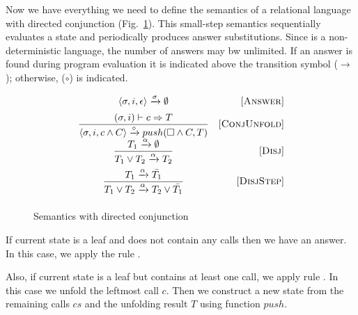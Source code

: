 
Now we have everything we need to define the semantics of a relational language with directed conjunction (Fig.~\ref{fair:classic-semantics}). This small-step semantics sequentially
evaluates a state and periodically produces answer substitutions. Since \mk is a non-deterministic language, the number of answers may bw unlimited.
If an answer is found during program evaluation it is indicated above the transition symbol ($\xrightarrow{}$); otherwise, ($\circ$) is indicated.

\begin{figure}[h!]
\[\begin{array}{cr}
     {\langle \sigma, i, \epsilon \rangle \xrightarrow{\sigma} \emptyset}  
&     \mbox{[\textsc{Answer}]} \\[2mm]
\dfrac{(\sigma, i) \vdash c \Rightarrow T}
      {\langle \sigma, i, c \land C \rangle \xrightarrow{\circ} push(\Box \land C, T)}
&     \mbox{[\textsc{ConjUnfold}]} \\[2mm]
\dfrac{T_1 \xrightarrow{\alpha} \emptyset}
      {T_1 \lor T_2 \xrightarrow{\alpha} T_2}
&     \mbox{[\textsc{Disj}]} \\[4mm]
\dfrac{T_1 \xrightarrow{\alpha} \bar{T_1}}
      {T_1 \lor T_2 \xrightarrow{\alpha} T_2 \lor\bar{T_1}}
&     \mbox{[\textsc{DisjStep}]} \\[4mm]
\end{array}\]
\caption{Semantics with directed conjunction}
\label{fair:classic-semantics}
\end{figure}

If current state is a leaf and does not contain any calls then we have an answer. In this case, we apply the rule .

Also, if current state is a leaf but contains at least one call, we apply rule . In this case we unfold the leftmost call $c$.
Then we construct a new state from the remaining calls $cs$ and the unfolding result $T$ using function $push$.

